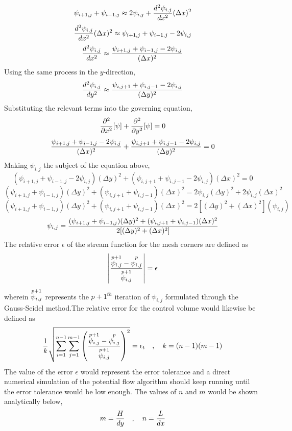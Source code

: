 \documentclass[class=report, 12pt, crop=false]{standalone}
\begin{document}
\begin{center}
$$\psi_{i + 1,j} + \psi_{i - 1,j} \approx 2\psi_{i,j} + \frac{d^2\psi_{i,j}}{dx^2}(\Delta x)^2$$
$$\frac{d^2\psi_{i,j}}{dx^2}(\Delta x)^2\approx \psi_{i + 1,j} + \psi_{i - 1,j} - 2\psi_{i,j}$$
$$\frac{d^2\psi_{i,j}}{dx^2} \approx \frac{\psi_{i + 1,j} + \psi_{i - 1,j} - 2\psi_{i,j}}{(\Delta x)^2}$$
Using the same process in the $y$-direction,
$$\frac{d^2\psi_{i,j}}{dy^2} \approx \frac{\psi_{i,j + 1} + \psi_{i,j - 1} - 2\psi_{i,j}}{(\Delta y)^2}$$
Substituting the relevant terms into the governing equation,
$$\frac{\partial^2}{\partial x^2}[\psi] + \frac{\partial^2}{\partial y^2}[\psi] = 0$$
$$\frac{\psi_{i + 1,j} + \psi_{i - 1,j} - 2\psi_{i,j}}{(\Delta x)^2} + \frac{\psi_{i,j + 1} + \psi_{i,j - 1} - 2\psi_{i,j}}{(\Delta y)^2} = 0$$
Making $\psi_{i,j}$ the subject of the equation above,
$$(\psi_{i + 1,j} + \psi_{i - 1,j} - 2\psi_{i,j})(\Delta y)^2 + (\psi_{i,j + 1} + \psi_{i,j - 1} - 2\psi_{i,j})(\Delta x)^2 = 0$$
$$(\psi_{i + 1,j} + \psi_{i - 1,j})(\Delta y)^2 + (\psi_{i,j + 1} + \psi_{i,j - 1})(\Delta x)^2 = 2\psi_{i,j}(\Delta y)^2 + 2\psi_{i,j}(\Delta x)^2$$
$$(\psi_{i + 1,j} + \psi_{i - 1,j})(\Delta y)^2 + (\psi_{i,j + 1} + \psi_{i,j - 1})(\Delta x)^2 = 2[(\Delta y)^2 + (\Delta x)^2](\psi_{i,j})$$
$$\psi_{i,j} = \frac{(\psi_{i + 1,j} + \psi_{i - 1,j})(\Delta y)^2 + (\psi_{i,j + 1} + \psi_{i,j - 1})(\Delta x)^2}{2[(\Delta y)^2 + (\Delta x)^2]}$$
The relative error $\epsilon$ of the stream function for the mesh corners are defined as
$$\left|\frac{\overset{p+1}{\psi_{i,j}} - \overset{p}{\psi_{i,j}}}{\overset{p+1}{\psi_{i,j}}}\right| = \epsilon$$
wherein $\displaystyle{\overset{p+1}{\psi_{i,j}}}$ represents the $p+1^{th}$ iteration of $\psi_{i,j}$ formulated through the Gauss-Seidel method.The relative error for the control volume would likewise be defined as
$$\frac{1}{k}\sqrt{\sum^{n-1}_{i = 1}\sum^{m-1}_{j = 1}\left(\frac{\overset{p+1}{\psi_{i,j}} - \overset{p}{\psi_{i,j}}}{\overset{p+1}{\psi_{i,j}}}\right)^2} = \epsilon_{t}\quad,\quad k = (n-1)(m-1)$$
The value of the error $\epsilon$ would represent the error tolerance and a direct numerical simulation of the potential flow algorithm should keep running until the error tolerance would be low enough. The values of $n$ and $m$ would be shown analytically below,
$$m = \frac{H}{dy}\quad,\quad n = \frac{L}{dx}$$
\end{center}
\end{document}
